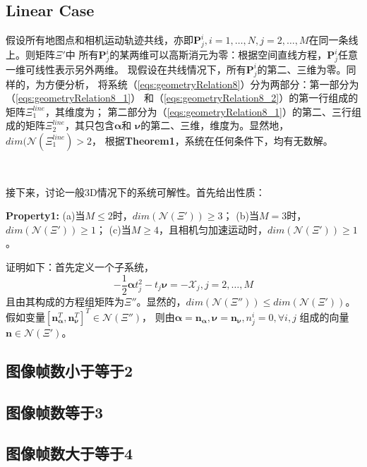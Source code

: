 \documentclass{article}
\begin{document}
\subsection{Linear Case}
假设所有地图点和相机运动轨迹共线，亦即$\textbf{P}_j^i,i=1,\dots,N,j=2,\dots,M$在同一条线上。则矩阵$\Xi'$中
所有$\textbf{P}_j^i$的某两维可以高斯消元为零：根据空间直线方程，$\textbf{P}_j^i$任意一维可线性表示另外两维。
现假设在共线情况下，所有$\textbf{P}_j^i$的第二、三维为零。同样的，为方便分析，
将系统（\ref{eqs:geometryRelation8}）分为两部分：第一部分为（\ref{eqs:geometryRelation8_1}）
和（\ref{eqs:geometryRelation8_2}）的第一行组成的矩阵$\Xi_1^{line}$，其维度为{\color{red}{$(M-1)N\times (MN+2)$}}；
第二部分为（\ref{eqs:geometryRelation8_1}）的第二、三行组成的矩阵$\Xi_2^{line}$，其只包含$\mathbf{\alpha}$和
$\mathbf{\nu}$的第二、三维，维度为{\color{red}{$2(M-1)\times 4$}}。显然地，$dim(\mathcal{N}(\Xi_1^{line})>2$，
根据\textbf{Theorem1}，系统在任何条件下，均有无数解。
\par
\ 
\par
接下来，讨论一般3D情况下的系统可解性。首先给出性质：
\par
\textbf{Property1: } (a)当$M\leqslant 2$时，$dim(\mathcal{N}(\Xi'))\geqslant 3$；
(b)当$M=3$时，$dim(\mathcal{N}(\Xi'))\geqslant 1$；
(c)当$M\geqslant 4$，且相机匀加速运动时，$dim(\mathcal{N}(\Xi'))\geqslant 1$。
\par
证明如下：首先定义一个子系统，
\begin{equation}
    -\frac{1}{2}\mathbf{\alpha}t_j^2-t_j\mathbf{\nu}=-\mathcal{X}_j, j=2,\dots,M
\end{equation}
且由其构成的方程组矩阵为$\Xi''$。显然的，$dim(\mathcal{N}(\Xi''))\leqslant dim(\mathcal{N}(\Xi'))$。
假如变量$\left[\textbf{n}_\mathbf{\alpha}^T,\textbf{n}_\mathbf{\nu}^T\right]^T\in\mathcal{N}(\Xi'')$，
则由$\mathbf{\alpha}=\textbf{n}_{\mathbf{\alpha}},\mathbf{\nu}=\textbf{n}_{\mathbf{\nu}},n_j^i=0, \forall i,j$
组成的向量$\textbf{n}\in \mathcal{N}(\Xi')$。


\subsection{图像帧数小于等于2}

\subsection{图像帧数等于3}

\subsection{图像帧数大于等于4}
\end{document}
